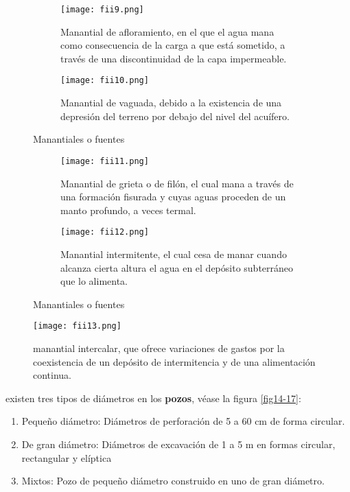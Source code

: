 \begin{figure}[h!]
	\centering
	\begin{subfigure}[b]{0.4\linewidth}
		\texttt{[image: fii9.png]}
		\caption{Manantial de afloramiento, en el que el agua mana como consecuencia
			de la carga a que está sometido, a través de una discontinuidad de la capa
			impermeable.}
		\label{fii9}
	\end{subfigure}
	\begin{subfigure}[b]{0.4\linewidth}
		\texttt{[image: fii10.png]}
		\caption{ Manantial de vaguada, debido a la existencia de una depresión del
			terreno por debajo del nivel del acuífero.}
		\label{fii10}
	\end{subfigure}
	\caption{Manantiales o fuentes}
	\begin{subfigure}[b]{0.4\linewidth}
		\texttt{[image: fii11.png]}
		\caption{Manantial de grieta o de filón, el cual mana a través de una
			formación fisurada y cuyas aguas proceden de un manto profundo, a veces
			termal.}
		\label{fii11}
	\end{subfigure}
	\begin{subfigure}[b]{0.4\linewidth}
		\texttt{[image: fii12.png]}
		\caption{ Manantial intermitente, el cual cesa de manar cuando alcanza cierta
			altura el agua en el depósito subterráneo que lo alimenta.}
		\label{fii12}
	\end{subfigure}
	\caption{Manantiales o fuentes}
	\label{fig9-12}
\end{figure}

\begin{figure}
	\centerline{\texttt{[image: fii13.png]}}
	\caption{manantial intercalar, que ofrece variaciones de gastos por la
		coexistencia de un depósito de intermitencia y de una alimentación continua.}
	\label{fii13}
\end{figure}

existen tres tipos de diámetros en los \textbf{pozos}, véase la figura \ref{fig14-17}:
\begin{enumerate}
	\item Pequeño diámetro: Diámetros de perforación de 5 a 60 cm de forma circular.
	\item De gran diámetro: Diámetros de excavación de 1 a 5 m en formas circular, rectangular y
	      elíptica
	\item   Mixtos: Pozo de pequeño diámetro construido en uno de gran diámetro.
\end{enumerate}


